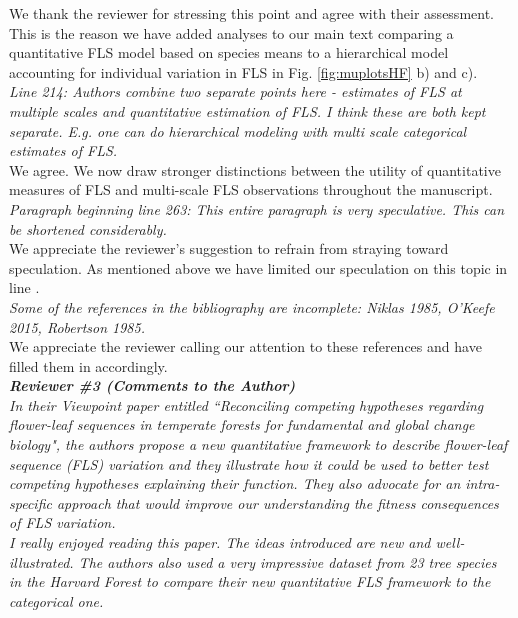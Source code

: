 \documentclass{article}[11pt]
\begin{document}
\noindent We thank the reviewer for stressing this point and agree with their assessment. This is the reason we have added analyses to our main text comparing a quantitative FLS model based on species means to a hierarchical model accounting for individual variation in FLS in Fig.  \ref{fig:muplotsHF} b) and c).\\

\emph{Line 214: Authors combine two separate points here - estimates of FLS at multiple scales and quantitative estimation of FLS. I think these are both kept separate. E.g. one can do hierarchical modeling with  multi scale categorical estimates of FLS.}\\

\noindent We agree. We now draw stronger distinctions between the utility of quantitative measures of FLS and multi-scale FLS observations throughout the manuscript.\\ 

\emph{Paragraph beginning line 263: This entire paragraph is very speculative. This can be shortened considerably.}\\

\noindent We appreciate the reviewer's suggestion to refrain from straying toward speculation. As mentioned above we have limited our speculation on this topic in line . \\

\emph{Some of the references in the bibliography are incomplete: Niklas 1985, O'Keefe 2015,  Robertson 1985.}\\
 
\noindent We appreciate the reviewer calling our attention to these references and have filled them in accordingly.\\

\emph{{\bf Reviewer \#3 (Comments to the Author)}}\\
\emph{In their Viewpoint paper entitled ``Reconciling competing hypotheses regarding flower-leaf sequences in temperate forests for fundamental and global change biology", the authors propose a new quantitative framework to describe flower-leaf sequence (FLS) variation and they illustrate how it could be used to better test competing hypotheses explaining their function. They also advocate for an intra-specific approach that would improve our understanding the fitness consequences of FLS variation.\\
I really enjoyed reading this paper. The ideas introduced are new and well-illustrated. The authors also used a very impressive dataset from 23 tree species in the Harvard Forest to compare their new quantitative FLS framework to the categorical one.}\\
\end{document}
